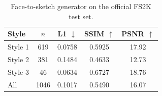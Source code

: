 \begin{table}[t]\centering\caption{Face-to-sketch generator on the official FS2K test set.}\label{tab:gan}
\begin{tabular}{lcccc}\toprule Style & $n$ & L1 $\downarrow$ & SSIM $\uparrow$ & PSNR $\uparrow$\\\midrule
Style 1 & 619 & 0.0758 & 0.5925 & 17.92\\
Style 2 & 381 & 0.1484 & 0.4633 & 12.73\\
Style 3 & 46 & 0.0634 & 0.6727 & 18.76\\
\midrule All & 1046 & 0.1017 & 0.5490 & 16.07\\
\bottomrule\end{tabular}\end{table}